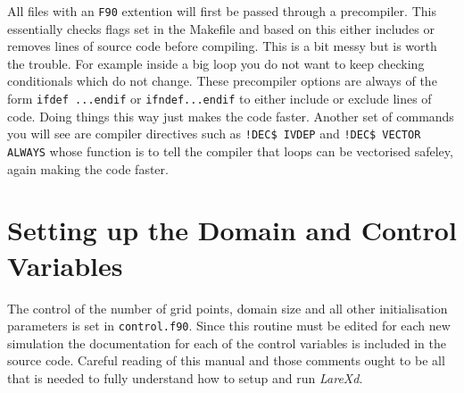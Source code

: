 \documentclass[11pt]{article}
\begin{document}
All files with an \texttt{F90} extention will first be passed through a precompiler. This essentially checks flags set in the Makefile and based on this either includes or removes lines of source code before compiling. This is a bit messy but is worth the trouble. For example inside a big loop you do not want to keep checking conditionals which do not change. These precompiler options are always of the form \texttt{ifdef ...endif} or \texttt{ifndef...endif} to either include or exclude lines of code. Doing things this way just makes the code faster. Another set of commands you will see are compiler directives such as \texttt{!DEC\$ IVDEP} and \texttt{!DEC\$ VECTOR ALWAYS} whose function is to tell the compiler that loops can be vectorised safeley, again making the code faster. 

\section{Setting up the Domain and Control Variables}
The control of the number of grid points, domain size and all other initialisation parameters is set in \texttt{control.f90}. Since this routine must be edited for each new simulation the documentation for each of the control variables is included in the source code. Careful reading of this manual and those comments ought to be all that is needed to fully understand how to setup and run \textit{LareXd}.
\end{document}
